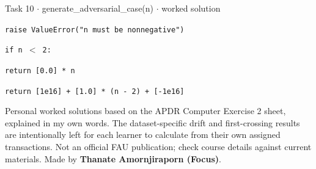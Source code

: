 \documentclass[11pt]{article}
\begin{document}
\begin{keepsection}
\begin{workedbox}{Task 10 \ensuremath{\cdot} generate\_adversarial\_case(n) \ensuremath{\cdot} worked solution}
\begin{enumerate}
\begin{tcolorbox}[colback=Paperblue,colframe=Paperblue,boxrule=0pt,arc=0pt,left=7pt,right=7pt,top=5pt,bottom=5pt]
\noindent\hspace*{3em}\texttt{raise ValueError("n must be nonnegative")}\par
\noindent\hspace*{1em}\texttt{if n \ensuremath{<} 2:}\par
\noindent\hspace*{3em}\texttt{return [0.0] * n}\par
\noindent\hspace*{1em}\texttt{return [1e16] + [1.0] * (n - 2) + [-1e16]}\par
\end{tcolorbox}
\end{enumerate}
\end{workedbox}

\end{keepsection}

\vfill{\small Personal worked solutions based on the APDR Computer Exercise 2 sheet, explained in my own words. The dataset-specific drift and first-crossing results are intentionally left for each learner to calculate from their own assigned transactions. Not an official FAU publication; check course details against current materials. Made by \textbf{Thanate Amornjiraporn (Focus)}.}
\end{document}
